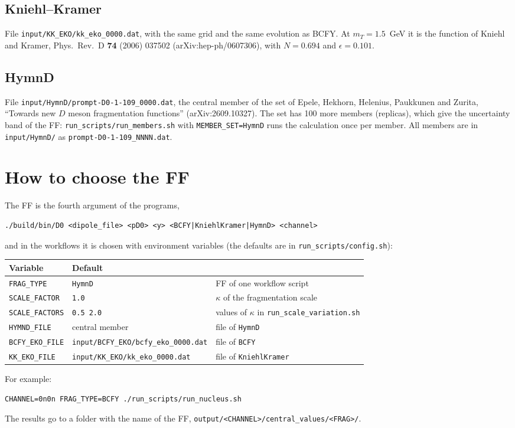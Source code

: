 \documentclass{article}
\begin{document}
\subsection{Kniehl--Kramer}

File \texttt{input/KK\_EKO/kk\_eko\_0000.dat}, with the same grid and the same
evolution as BCFY. At $m_T = 1.5$~GeV it is the function of Kniehl and
Kramer, Phys.\ Rev.\ D \textbf{74} (2006) 037502 (arXiv:hep-ph/0607306),
with $N = 0.694$ and $\epsilon = 0.101$.

\subsection{HymnD}

File \texttt{input/HymnD/prompt-D0-1-109\_0000.dat}, the central member of
the set of Epele, Hekhorn, Helenius, Paukkunen and Zurita, ``Towards new $D$
meson fragmentation functions'' (arXiv:2609.10327). The set has 100 more members (replicas), which give the uncertainty
band of the FF: \texttt{run\_scripts/run\_members.sh} with
\texttt{MEMBER\_SET=HymnD} runs the calculation once per member. All members are in
\texttt{input/HymnD/} as \texttt{prompt-D0-1-109\_NNNN.dat}.

\section{How to choose the FF}

The FF is the fourth argument of the programs,
\begin{verbatim}
./build/bin/D0 <dipole_file> <pD0> <y> <BCFY|KniehlKramer|HymnD> <channel>
\end{verbatim}
and in the workflows it is chosen with environment variables (the defaults
are in \texttt{run\_scripts/config.sh}):

\begin{center}
\begin{tabular}{@{}lll@{}}
\toprule
Variable & Default & \\
\midrule
\texttt{FRAG\_TYPE} & \texttt{HymnD} & FF of one workflow script \\
\texttt{SCALE\_FACTOR} & \texttt{1.0} & $\kappa$ of the fragmentation scale \\
\texttt{SCALE\_FACTORS} & \texttt{0.5 2.0} & values of $\kappa$ in \texttt{run\_scale\_variation.sh} \\
\texttt{HYMND\_FILE} & central member & file of \texttt{HymnD} \\
\texttt{BCFY\_EKO\_FILE} & \texttt{input/BCFY\_EKO/bcfy\_eko\_0000.dat} & file of \texttt{BCFY} \\
\texttt{KK\_EKO\_FILE} & \texttt{input/KK\_EKO/kk\_eko\_0000.dat} & file of \texttt{KniehlKramer} \\
\bottomrule
\end{tabular}
\end{center}
For example:
\begin{verbatim}
CHANNEL=0n0n FRAG_TYPE=BCFY ./run_scripts/run_nucleus.sh
\end{verbatim}
The results go to a folder with the name of the FF,
\texttt{output/<CHANNEL>/central\_values/<FRAG>/}.
\end{document}
